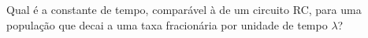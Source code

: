 Qual é a constante de tempo, comparável à de um circuito RC, para uma população que decai a uma taxa fracionária por unidade de tempo $\lambda$?
